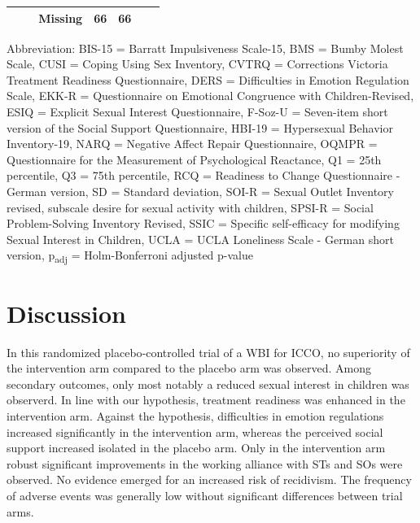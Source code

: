 \documentclass[
  super,
  preprint,
  1p,
  onecolumn]{elsarticle}
\begin{document}
\begin{table}
{\begin{tabular*}{\linewidth}{@{\extracolsep{\fill}}lcccc}
    Missing & 66 & 66 &  &  \\ 
\bottomrule
\end{tabular*}
\begin{minipage}{\linewidth}
\vspace{.05em}
\parbox{\linewidth}{\raggedright {Abbreviation: BIS-15 = Barratt Impulsiveness Scale-15, BMS = Bumby Molest Scale, CUSI = Coping Using Sex Inventory, CVTRQ = Corrections Victoria Treatment Readiness Questionnaire, DERS = Difficulties in Emotion Regulation Scale, EKK-R = Questionnaire on Emotional Congruence with Children-Revised, ESIQ = Explicit Sexual Interest Questionnaire, F-Soz-U = Seven-item short version of the Social Support Questionnaire, HBI-19 = Hypersexual Behavior Inventory-19, NARQ = Negative Affect Repair Questionnaire, OQMPR = Questionnaire for the Measurement of Psychological Reactance, Q1 = 25th percentile, Q3 = 75th percentile, RCQ = Readiness to Change Questionnaire - German version, SD = Standard deviation, SOI-R = Sexual Outlet Inventory revised, subscale desire for sexual activity with children, SPSI-R = Social Problem-Solving Inventory Revised, SSIC = Specific self-efficacy for modifying Sexual Interest in Children, UCLA = UCLA Loneliness Scale - German short version, p\textsubscript{adj} = Holm-Bonferroni adjusted p-value\\
}}\end{minipage}

}

\end{table}%

\newpage{}

\section{Discussion}\label{discussion}

In this randomized placebo‑controlled trial of a WBI for ICCO, no
superiority of the intervention arm compared to the placebo arm was
observed. Among secondary outcomes, only most notably a reduced sexual
interest in children was observerd. In line with our hypothesis,
treatment readiness was enhanced in the intervention arm. Against the
hypothesis, difficulties in emotion regulations increased significantly
in the intervention arm, whereas the perceived social support increased
isolated in the placebo arm. Only in the intervention arm robust
significant improvements in the working alliance with STs and SOs were
observed. No evidence emerged for an increased risk of recidivism. The
frequency of adverse events was generally low without significant
differences between trial arms.
\end{document}
